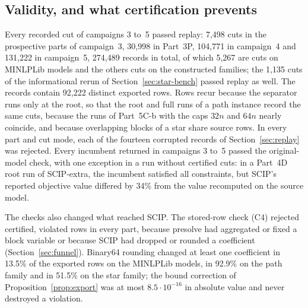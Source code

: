 \subsection{Validity, and what certification prevents}\label{sec:validity}

Every recorded cut of campaigns 3 to~5 passed replay: 7{,}498 cuts in the
prospective parts of campaign~3, 30{,}998 in Part~3P, 104{,}771 in campaign~4
and 131{,}222 in campaign~5, 274{,}489 records in total, of which 5{,}267 are cuts
on MINLPLib models and the others cuts on the constructed families; the 1{,}135
cuts of the informational rerun of Section~\ref{sec:star-bench} passed replay as
well. The records contain 92{,}222 distinct exported rows. Rows recur because
the separator runs only at the root, so that the root and full runs of a path
instance record the same cuts, because the runs of Part~5C-b with the caps
$32n$ and $64n$ nearly coincide, and because overlapping blocks of a star share
source rows. In every part and cut mode, each of the fourteen
corrupted records of Section~\ref{sec:replay} was rejected. Every incumbent
returned in campaigns 3 to~5 passed the original-model check, with one
exception in a run without certified cuts: in a Part~4D root run of
SCIP-extra, the incumbent satisfied all constraints, but SCIP's reported
objective value differed by 34\% from the value recomputed on the source model.

The checks also changed what reached SCIP. The stored-row check (C4) rejected
certified, violated rows in every part, because presolve had aggregated or
fixed a block variable or because SCIP had dropped or rounded a coefficient
(Section~\ref{sec:funnel}). Binary64 rounding changed at least one coefficient
in 13.5\% of the exported rows on the MINLPLib models, in 92.9\% on the path
family and in 51.5\% on the star family; the bound correction of Proposition~\ref{prop:export} was at most
$8.5\cdot10^{-16}$ in absolute value and never destroyed a violation.

